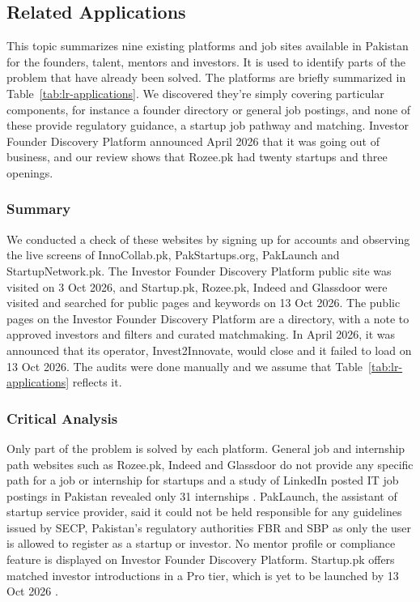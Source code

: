 \documentclass{FastFyp}
\begin{document}
\subsection{Related Applications}\label{sec:platforms}
This topic summarizes nine existing platforms and job sites available in Pakistan for the founders, talent, mentors and investors. It is used to identify parts of the problem that have already been solved. The platforms are briefly summarized in Table~\ref{tab:lr-applications}. We discovered they're simply covering particular components, for instance a founder directory or general job postings, and none of these provide regulatory guidance, a startup job pathway and matching. Investor Founder Discovery Platform announced April 2026 that it was going out of business, and our review shows that Rozee.pk had twenty startups and three openings.

\subsubsection{Summary}
We conducted a check of these websites by signing up for accounts and observing the live screens of InnoCollab.pk, PakStartups.org, PakLaunch and StartupNetwork.pk. The Investor Founder Discovery Platform public site was visited on 3 Oct 2026, and Startup.pk, Rozee.pk, Indeed and Glassdoor were visited and searched for public pages and keywords on 13 Oct 2026. The public pages on the Investor Founder Discovery Platform are a directory, with a note to approved investors and filters and curated matchmaking. In April 2026, it was announced that its operator, Invest2Innovate, would close and it failed to load on 13 Oct 2026. The audits were done manually and we assume that Table~\ref{tab:lr-applications} reflects it.

\subsubsection{Critical Analysis}
Only part of the problem is solved by each platform. General job and internship path websites such as Rozee.pk, Indeed and Glassdoor do not provide any specific path for a job or internship for startups \cite{ref:rozee,ref:indeed,ref:glassdoor} and a study of LinkedIn posted IT job postings in Pakistan revealed only 31 internships \cite{ref:mustafa2026itjobs}. PakLaunch, the assistant of startup service provider, said it could not be held responsible for any guidelines issued by SECP, Pakistan's regulatory authorities FBR and SBP as only the user is allowed to register as a startup or investor. No mentor profile or compliance feature is displayed on Investor Founder Discovery Platform. Startup.pk offers matched investor introductions in a Pro tier, which is yet to be launched by 13 Oct 2026 \cite{ref:startuppk}.
\end{document}
